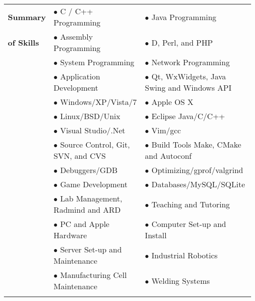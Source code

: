 \documentclass[12pt,a4paper]{article}
\begin{document}
\begin{tabular}{ p{} p{} p{ }  }
\textbf{Summary} & $\bullet$ C / C++ Programming & $\bullet$ Java Programming \\
\textbf{of Skills} & $\bullet$ Assembly Programming & $\bullet$ D, Perl, and PHP \\
\ & $\bullet$ System Programming & $\bullet$ Network Programming\\
\ & $\bullet$ Application Development & 
 $\bullet$ Qt, WxWidgets, Java Swing and Windows API \\
\ & $\bullet$ Windows/XP/Vista/7 & $\bullet$ Apple OS X \\
\ & $\bullet$ Linux/BSD/Unix & $\bullet$ Eclipse Java/C/C++ \\
\ & $\bullet$ Visual Studio/.Net & $\bullet$ Vim/gcc \\
\ & $\bullet$ Source Control, Git, SVN, and CVS & $\bullet$ Build Tools Make, CMake and Autoconf \\
\ & $\bullet$ Debuggers/GDB & $\bullet$ Optimizing/gprof/valgrind \\
\ & $\bullet$ Game Development & $\bullet$ Databases/MySQL/SQLite \\
\ & $\bullet$ Lab Management, Radmind and ARD & $\bullet$ Teaching and Tutoring\\ \
\ & $\bullet$ PC and Apple Hardware & $\bullet$ Computer Set-up and Install \\
\ & $\bullet$ Server Set-up and Maintenance & $\bullet$ Industrial Robotics \\
\ & $\bullet$ Manufacturing Cell Maintenance & $\bullet$ Welding Systems\\
\\
\end{tabular}
\end{document}
